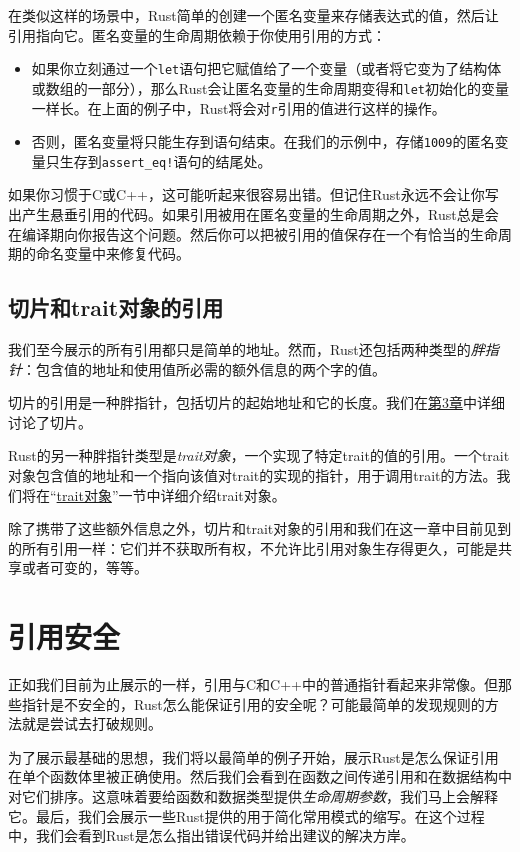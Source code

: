 在类似这样的场景中，Rust简单的创建一个匿名变量来存储表达式的值，然后让引用指向它。匿名变量的生命周期依赖于你使用引用的方式：
\begin{itemize}
    \item 如果你立刻通过一个\texttt{let}语句把它赋值给了一个变量（或者将它变为了结构体或数组的一部分），那么Rust会让匿名变量的生命周期变得和\texttt{let}初始化的变量一样长。在上面的例子中，Rust将会对\texttt{r}引用的值进行这样的操作。
    \item 否则，匿名变量将只能生存到语句结束。在我们的示例中，存储\texttt{1009}的匿名变量只生存到\texttt{assert\_eq!}语句的结尾处。
\end{itemize}

如果你习惯于C或C++，这可能听起来很容易出错。但记住Rust永远不会让你写出产生悬垂引用的代码。如果引用被用在匿名变量的生命周期之外，Rust总是会在编译期向你报告这个问题。然后你可以把被引用的值保存在一个有恰当的生命周期的命名变量中来修复代码。

\subsection{切片和trait对象的引用}
我们至今展示的所有引用都只是简单的地址。然而，Rust还包括两种类型的\emph{胖指针}：包含值的地址和使用值所必需的额外信息的两个字的值。

切片的引用是一种胖指针，包括切片的起始地址和它的长度。我们在\hyperref[ch03]{第3章}中详细讨论了切片。

Rust的另一种胖指针类型是\emph{trait对象}，一个实现了特定trait的值的引用。一个trait对象包含值的地址和一个指向该值对trait的实现的指针，用于调用trait的方法。我们将在“\hyperref[traitobject]{trait对象}”一节中详细介绍trait对象。

除了携带了这些额外信息之外，切片和trait对象的引用和我们在这一章中目前见到的所有引用一样：它们并不获取所有权，不允许比引用对象生存得更久，可能是共享或者可变的，等等。

\section{引用安全}

正如我们目前为止展示的一样，引用与C和C++中的普通指针看起来非常像。但那些指针是不安全的，Rust怎么能保证引用的安全呢？可能最简单的发现规则的方法就是尝试去打破规则。

为了展示最基础的思想，我们将以最简单的例子开始，展示Rust是怎么保证引用在单个函数体里被正确使用。然后我们会看到在函数之间传递引用和在数据结构中对它们排序。这意味着要给函数和数据类型提供\emph{生命周期参数}，我们马上会解释它。最后，我们会展示一些Rust提供的用于简化常用模式的缩写。在这个过程中，我们会看到Rust是怎么指出错误代码并给出建议的解决方岸。

